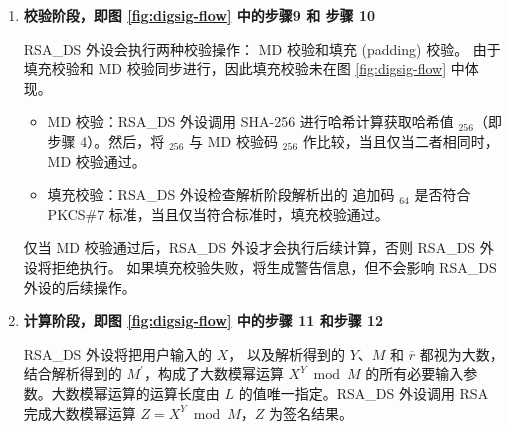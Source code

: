 \documentclass[main\_\_CN.tex]{subfiles}
\begin{document}
\begin{enumerate}
    \item {\bfseries 校验阶段，即图 \ref{fig:digsig-flow} 中的步骤9 和 步骤 10}

        RSA\_DS 外设会执行两种校验操作： MD 校验和填充 (padding) 校验。
        由于填充校验和 MD 校验同步进行，因此填充校验未在图 \ref{fig:digsig-flow} 中体现。


        \begin{itemize}

            \item MD 校验：RSA\_DS 外设调用 SHA-256 进行哈希计算获取哈希值 \begin{math}[CALC\_MD]_{256}\end{math}（即步骤 4）。然后，将 \begin{math}[CALC\_MD]_{256}\end{math} 与 MD 校验码 \begin{math}[MD]_{256}\end{math} 作比较，当且仅当二者相同时，MD 校验通过。

            \item 填充校验：RSA\_DS 外设检查解析阶段解析出的 追加码 \begin{math}[\beta]_{64} \end{math} 是否符合 PKCS\#7 标准，当且仅当符合标准时，填充校验通过。

        \end{itemize}

        仅当 MD 校验通过后，RSA\_DS 外设才会执行后续计算，否则 RSA\_DS 外设将拒绝执行。
        如果填充校验失败，将生成警告信息，但不会影响 RSA\_DS 外设的后续操作。

    \item {\bfseries 计算阶段，即图 \ref{fig:digsig-flow} 中的步骤 11 和步骤 12}

        RSA\_DS 外设将把用户输入的 \begin{math}X\end{math}，
        以及解析得到的 \begin{math}Y\end{math}、\begin{math}M\end{math} 和 \begin{math}\overline{r}\end{math} 都视为大数，结合解析得到的 \begin{math}M^{\prime}\end{math}，构成了大数模幂运算 \begin{math} X^{Y} \bmod M\end{math} 的所有必要输入参数。大数模幂运算的运算长度由 \begin{math}L\end{math} 的值唯一指定。RSA\_DS 外设调用 RSA 完成大数模幂运算 \begin{math}Z = X^{Y} \bmod M\end{math}，\begin{math}Z\end{math} 为签名结果。

\end{enumerate}
\end{document}
